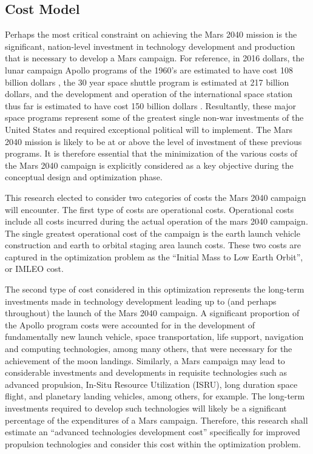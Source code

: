 \documentclass[]{aiaa-pretty}
\begin{document}
\subsection{Cost Model}
Perhaps the most critical constraint on achieving the Mars 2040 mission is the significant, nation-level investment in technology development and production that is necessary to develop a Mars campaign. For reference, in 2016 dollars, the lunar campaign Apollo programs of the 1960’s are estimated to have cost 108 billion dollars \cite{stine2008crs}, the 30 year space shuttle program is estimated at 217 billion dollars, and the development and operation of the international space station thus far is estimated to have cost 150 billion dollars \cite{lafleur2010costs}. Resultantly, these major space programs represent some of the greatest single non-war investments of the United States and required exceptional political will to implement. The Mars 2040 mission is likely to be at or above the level of investment of these previous programs. It is therefore essential that the minimization of the various costs of the Mars 2040 campaign is explicitly considered as a key objective during the conceptual design and optimization phase.

This research elected to consider two categories of costs the Mars 2040 campaign will encounter. The first type of costs are operational costs. Operational costs include all costs incurred during the actual operation of the mars 2040 campaign. The single greatest operational cost of the campaign is the earth launch vehicle construction and earth to orbital staging area launch costs. These two costs are captured in the optimization problem as the “Initial Mass to Low Earth Orbit”, or IMLEO cost. 

The second type of cost considered in this optimization represents the long-term investments made in technology development leading up to (and perhaps throughout) the launch of the Mars 2040 campaign. A significant proportion of the Apollo program costs were accounted for in the development of fundamentally new launch vehicle, space transportation, life support, navigation and computing technologies, among many others, that were necessary for the achievement of the moon landings. Similarly, a Mars campaign may lead to considerable investments and developments in requisite technologies such as advanced propulsion, In-Situ Resource Utilization (ISRU), long duration space flight, and planetary landing vehicles, among others, for example. The long-term investments required to develop such technologies will likely be a significant percentage of the expenditures of a Mars campaign. Therefore, this research shall estimate an “advanced technologies development cost” specifically for improved propulsion technologies and consider this cost within the optimization problem. 
\end{document}
